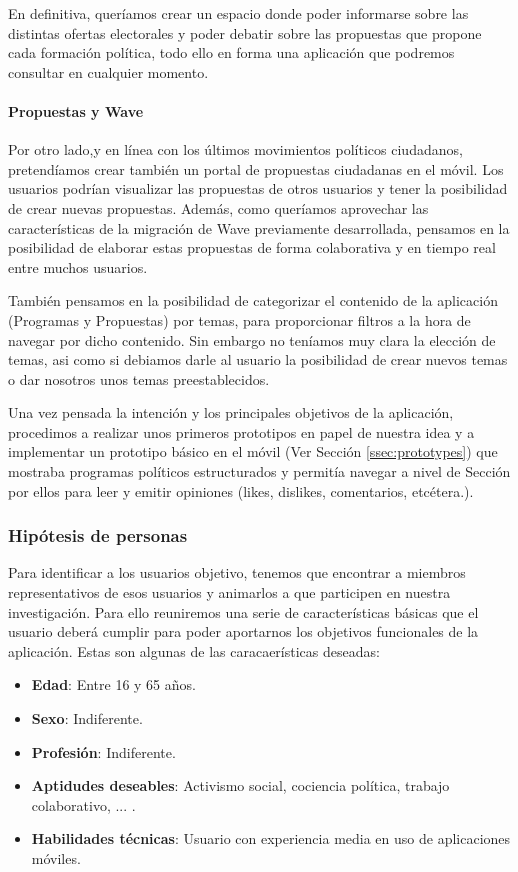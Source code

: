 En definitiva, queríamos crear un espacio donde poder informarse sobre las distintas ofertas electorales y poder debatir sobre las propuestas que propone cada formación política, todo ello en forma una aplicación que podremos consultar en cualquier momento. 

\paragraph{Propuestas y Wave}

Por otro lado,y en línea con los últimos movimientos políticos ciudadanos, pretendíamos crear también un portal de propuestas ciudadanas en el móvil. Los usuarios podrían visualizar las propuestas de otros usuarios y tener la posibilidad de crear nuevas propuestas. Además, como queríamos aprovechar las características de la migración de Wave previamente desarrollada, pensamos en la posibilidad de elaborar estas propuestas de forma colaborativa y en tiempo real entre muchos usuarios.

También pensamos en la posibilidad de categorizar el contenido de la aplicación (Programas y Propuestas) por temas, para proporcionar filtros a la hora de navegar por dicho contenido. Sin embargo no teníamos muy clara la elección de temas, asi como si debiamos darle al usuario la posibilidad de crear nuevos temas o dar nosotros unos temas preestablecidos.
 
Una vez pensada la intención y los principales objetivos de la aplicación, procedimos a realizar unos primeros prototipos en papel de nuestra idea y a implementar un prototipo básico en el móvil (Ver Sección \ref{ssec:prototypes}) que mostraba programas políticos estructurados y permitía navegar a nivel de Sección por ellos para leer y emitir opiniones (likes, dislikes, comentarios, etcétera.).  

\subsubsection{Hipótesis de personas}

Para identificar a los usuarios objetivo, tenemos que encontrar a miembros representativos de esos usuarios y animarlos a que participen en nuestra investigación. Para ello reuniremos una serie de características básicas que el usuario deberá cumplir para poder aportarnos los objetivos funcionales de la aplicación. Estas son algunas de las caracaerísticas deseadas:

\begin{itemize}
\item \textbf{Edad}: Entre 16 y 65 años.
\item \textbf{Sexo}: Indiferente.
\item \textbf{Profesión}: Indiferente.
\item \textbf{Aptidudes deseables}: Activismo social, cociencia política, trabajo colaborativo, ... .
\item \textbf{Habilidades técnicas}: Usuario con experiencia media en uso de aplicaciones móviles.
\end{itemize}

